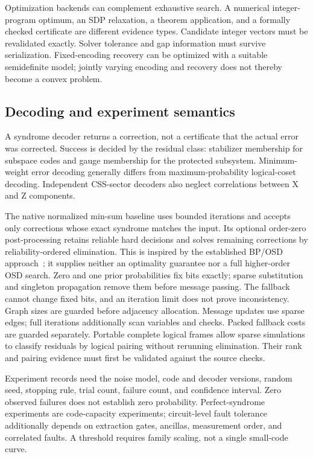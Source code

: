 Optimization backends can complement exhaustive search. A numerical
integer-program optimum, an SDP relaxation, a theorem application, and a
formally checked certificate are different evidence types. Candidate
integer vectors must be revalidated exactly. Solver tolerance and gap
information must survive serialization. Fixed-encoding recovery can be
optimized with a suitable semidefinite model; jointly varying encoding
and recovery does not thereby become a convex problem.

\subsection{Decoding and experiment semantics}
A syndrome decoder returns a correction, not a certificate that the
actual error was corrected. Success is decided by the residual class:
stabilizer membership for subspace codes and gauge membership for the
protected subsystem. Minimum-weight error decoding generally differs
from maximum-probability logical-coset decoding. Independent CSS-sector
decoders also neglect correlations between X and Z components.

The native normalized min-sum baseline uses bounded iterations and
accepts only corrections whose exact syndrome matches the input. Its
optional order-zero post-processing retains reliable hard decisions and
solves remaining corrections by reliability-ordered elimination. This is
inspired by the established BP/OSD approach~\cite{roffe2020}; it supplies
neither an optimality guarantee nor a full higher-order OSD search.
Zero and one prior probabilities fix bits exactly; sparse substitution
and singleton propagation remove them before message passing. The fallback
cannot change fixed bits, and an iteration limit does not prove inconsistency.
Graph sizes are guarded before adjacency allocation.
Message updates use sparse edges; full iterations additionally scan
variables and checks. Packed fallback costs are guarded separately.
Portable complete logical frames allow sparse simulations to classify
residuals by logical pairing without rerunning elimination. Their rank
and pairing evidence must first be validated against the source checks.

Experiment records need the noise model, code and decoder versions,
random seed, stopping rule, trial count, failure count, and confidence
interval. Zero observed failures does not establish zero probability.
Perfect-syndrome experiments are code-capacity experiments; circuit-level
fault tolerance additionally depends on extraction gates, ancillas,
measurement order, and correlated faults. A threshold requires family
scaling, not a single small-code curve.

